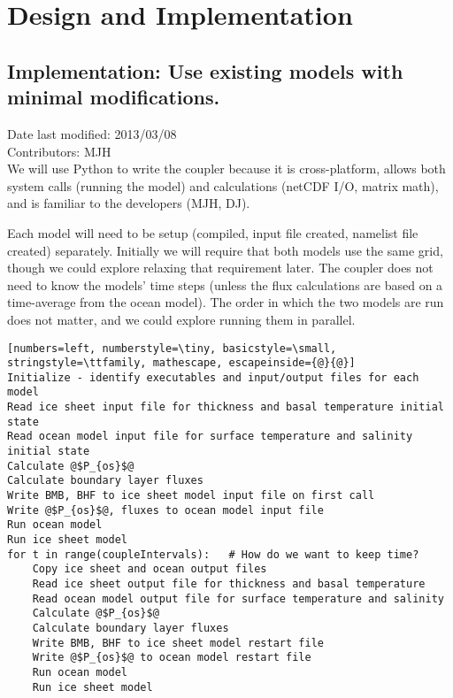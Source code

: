 \documentclass[11pt]{report}
\begin{document}

\chapter{Design and Implementation}


\section{Implementation: Use existing models with minimal modifications.}
Date last modified: 2013/03/08 \\
Contributors: MJH \\

We will use Python to write the coupler because it is cross-platform, allows both system calls (running the model) and calculations (netCDF I/O, matrix math), and is familiar to the developers (MJH, DJ).

Each model will need to be setup (compiled, input file created, namelist file created) separately.  Initially we will require that both models use the same grid, though we could explore relaxing that requirement later.  The coupler does not need to know the models' time steps (unless the flux calculations are based on a time-average from the ocean model).   The order in which the two models are run does not matter, and we could explore running them in parallel.

\begin{lstlisting}[numbers=left, numberstyle=\tiny, basicstyle=\small, stringstyle=\ttfamily, mathescape, escapeinside={@}{@}]
Initialize - identify executables and input/output files for each model
Read ice sheet input file for thickness and basal temperature initial state
Read ocean model input file for surface temperature and salinity initial state
Calculate @$P_{os}$@
Calculate boundary layer fluxes
Write BMB, BHF to ice sheet model input file on first call
Write @$P_{os}$@, fluxes to ocean model input file
Run ocean model
Run ice sheet model
for t in range(coupleIntervals):   # How do we want to keep time?
	Copy ice sheet and ocean output files
	Read ice sheet output file for thickness and basal temperature
	Read ocean model output file for surface temperature and salinity
	Calculate @$P_{os}$@
	Calculate boundary layer fluxes
	Write BMB, BHF to ice sheet model restart file 
	Write @$P_{os}$@ to ocean model restart file
	Run ocean model
	Run ice sheet model
\end{lstlisting}
\end{document}
